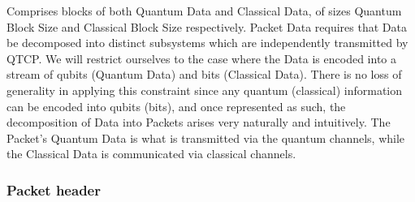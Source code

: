 \documentclass[aps,rmp,twocolumn,amsmath,amssymb,nofootinbib,superscriptaddress]{revtex4}
\begin{document}
Comprises blocks of both {\sc Quantum Data} and {\sc Classical Data}, of sizes {\sc Quantum Block Size} and {\sc Classical Block Size} respectively. {\sc Packet Data} requires that {\sc Data} be decomposed into distinct subsystems which are independently transmitted by QTCP. We will restrict ourselves to the case where the {\sc Data} is encoded into a stream of qubits ({\sc Quantum Data}) and bits ({\sc Classical Data}). There is no loss of generality in applying this constraint since any quantum (classical) information can be encoded into qubits (bits), and once represented as such, the decomposition of {\sc Data} into {\sc Packets} arises very naturally and intuitively. The {\sc Packet's} {\sc Quantum Data} is what is transmitted via the quantum channels, while the {\sc Classical Data} is communicated via classical channels.

%
%

\subsubsection{Packet header} \label{sec:packet_header}
\end{document}
